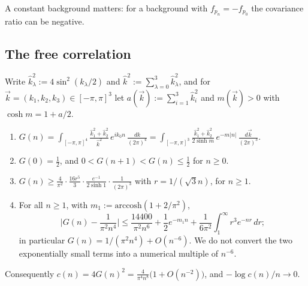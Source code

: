 A constant background matters: for a background with $f_{p_n}=-f_{p_0}$ the covariance ratio can be negative.

\subsection{The free correlation}\label{pf:sec-G}

Write $\hat k_\lambda^2:=4\sin^2(k_\lambda/2)$ and $\hat k^2:=\sum_{\lambda=0}^3\hat k_\lambda^2$, and for $\vec k=(k_1,k_2,k_3)\in[-\pi,\pi]^3$ let $a(\vec k):=\sum_{i=1}^3\hat k_i^2$ and $m(\vec k)>0$ with $\cosh m=1+a/2$.

\begin{lemma}\label{pf:lem-G}
\leavevmode
\begin{enumerate}
\item $G(n)=\displaystyle\int_{[-\pi,\pi]^4}\frac{\hat k_1^2+\hat k_2^2}{\hat k^2}\,e^{ik_0n}\,\frac{dk}{(2\pi)^4}=\int_{[-\pi,\pi]^3}\frac{\hat k_1^2+\hat k_2^2}{2\sinh m}\,e^{-m|n|}\,\frac{d\vec k}{(2\pi)^3}$.
\item $G(0)=\tfrac12$, and $0<G(n+1)<G(n)\le\tfrac12$ for $n\ge0$.
\item $G(n)\ge\frac4{\pi^2}\cdot\frac{16r^5}3\cdot\frac{e^{-1}}{2\sinh1}\cdot\frac1{(2\pi)^3}$ with $r=1/(\sqrt3n)$, for $n\ge1$.
\item For all $n\ge1$, with $m_1:=\mathrm{arccosh}(1+2/\pi^2)$,
\[\Big|G(n)-\frac1{\pi^2n^4}\Big|\le\frac{14400}{\pi^2n^6}+\frac12e^{-m_1n}+\frac1{6\pi^2}\int_1^\infty r^3e^{-nr}\,dr ;\]
in particular $G(n)=1/(\pi^2n^4)+O(n^{-6})$. We do not convert the two exponentially small terms into a numerical multiple of $n^{-6}$.
\end{enumerate}
Consequently $c(n)=4G(n)^2=\frac4{\pi^4n^8}\big(1+O(n^{-2})\big)$, and $-\log c(n)/n\to0$.
\end{lemma}

